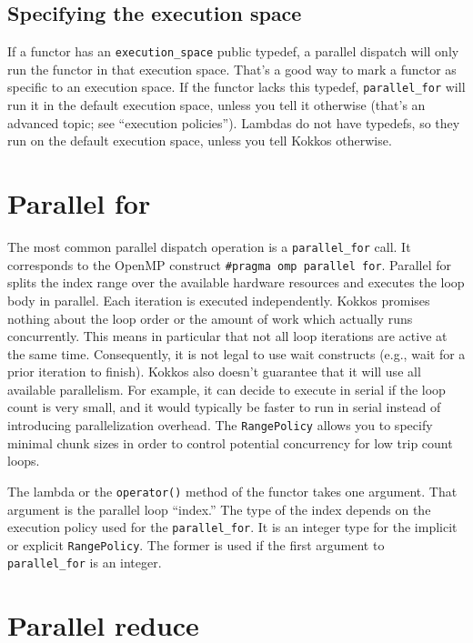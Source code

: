 \subsection{Specifying the execution space}

If a functor has an \lstinline|execution_space| public typedef, a parallel dispatch will only run the functor in that execution space.
That's a good way to mark a functor as specific to an execution space.  
If the functor lacks this typedef, \lstinline|parallel_for| will run it in the default execution space, unless you tell it otherwise (that's an advanced topic; see ``execution policies'').
Lambdas do not have typedefs, so they run on the default execution space, unless you tell Kokkos otherwise.

\section{Parallel for}

The most common parallel dispatch operation is a \lstinline|parallel_for| call.
It corresponds to the OpenMP construct \lstinline!#pragma omp parallel for!.
Parallel for splits the index range over the available hardware resources and executes the loop body in parallel.
Each iteration is executed independently.
Kokkos promises nothing about the loop order or the amount of work which actually runs concurrently. 
This means in particular that not all loop iterations are active at the same time.  Consequently, it is not legal to use wait constructs (e.g., wait for a prior iteration to finish). 
Kokkos also doesn't guarantee that it will use all available parallelism. 
For example, it can decide to execute in serial if the loop count is very small, and it would typically be faster to run in serial instead of introducing parallelization overhead.
The \lstinline|RangePolicy| allows you to specify minimal chunk sizes in order to control potential concurrency for low trip count loops.

The lambda or the \lstinline!operator()! method of the functor takes one argument.  That argument is the parallel loop ``index.''
The type of the index depends on the execution policy used for the \lstinline!parallel_for!.  It is an integer type for the implicit or explicit \lstinline|RangePolicy|.
The former is used if the first argument to \lstinline|parallel_for| is an integer. 

\section{Parallel reduce}

